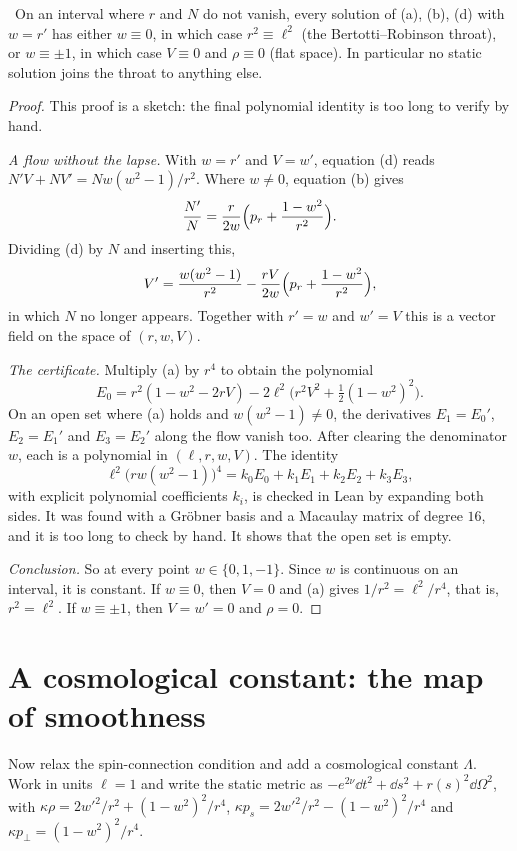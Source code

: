 \begin{theorem}\label{thm:staticclass}\ver\nogo\
On an interval where $r$ and $N$ do not vanish, every solution of (a), (b), (d) with $w=r'$ has either $w\equiv0$, in which case $r^2\equiv\ell^2$ (the Bertotti--Robinson throat), or $w\equiv\pm1$, in which case $V\equiv0$ and $\rho\equiv0$ (flat space). In particular no static solution joins the throat to anything else.
\end{theorem}
\begin{proof}
This proof is a sketch: the final polynomial identity is too long to verify by hand.

\emph{A flow without the lapse.} With $w=r'$ and $V=w'$, equation (d) reads $N'V+NV'=Nw(w^2-1)/r^2$. Where $w\ne0$, equation (b) gives
\[
\frac{N'}N=\frac r{2w}\Bigl(p_r+\frac{1-w^2}{r^2}\Bigr).
\]
Dividing (d) by $N$ and inserting this,
\[
V'=\frac{w(w^2-1)}{r^2}-\frac{rV}{2w}\Bigl(p_r+\frac{1-w^2}{r^2}\Bigr),
\]
in which $N$ no longer appears. Together with $r'=w$ and $w'=V$ this is a vector field on the space of $(r,w,V)$.

\emph{The certificate.} Multiply (a) by $r^4$ to obtain the polynomial
\[
E_0=r^2(1-w^2-2rV)-2\ell^2\bigl(r^2V^2+\tfrac12(1-w^2)^2\bigr).
\]
On an open set where (a) holds and $w(w^2-1)\ne0$, the derivatives $E_1=E_0'$, $E_2=E_1'$ and $E_3=E_2'$ along the flow vanish too. After clearing the denominator $w$, each is a polynomial in $(\ell,r,w,V)$. The identity
\[
\ell^2\bigl(rw(w^2-1)\bigr)^4=k_0E_0+k_1E_1+k_2E_2+k_3E_3 ,
\]
with explicit polynomial coefficients $k_i$, is checked in Lean by expanding both sides. It was found with a Gr\"obner basis and a Macaulay matrix of degree $16$, and it is too long to check by hand. It shows that the open set is empty.

\emph{Conclusion.} So at every point $w\in\{0,1,-1\}$. Since $w$ is continuous on an interval, it is constant. If $w\equiv0$, then $V=0$ and (a) gives $1/r^2=\ell^2/r^4$, that is, $r^2=\ell^2$. If $w\equiv\pm1$, then $V=w'=0$ and $\rho=0$.
\end{proof}


\section{A cosmological constant: the map of smoothness}

Now relax the spin-connection condition and add a cosmological constant $\Lambda$. Work in units $\ell=1$ and write the static metric as $-e^{2\nu}\dd t^2+\dd s^2+r(s)^2\dd\Omega^2$, with $\kappa\rho=2w'^2/r^2+(1-w^2)^2/r^4$, $\kappa p_s=2w'^2/r^2-(1-w^2)^2/r^4$ and $\kappa p_\perp=(1-w^2)^2/r^4$.

